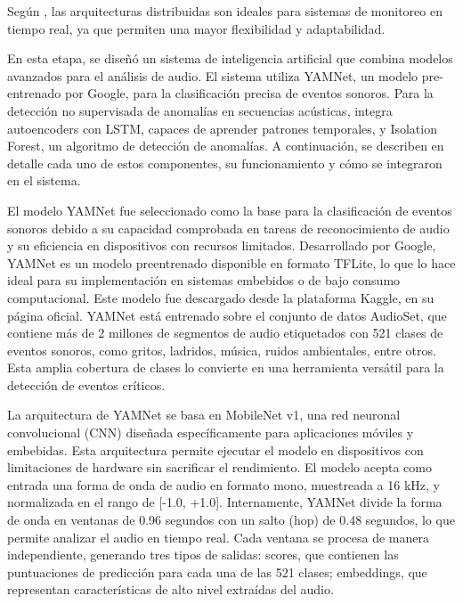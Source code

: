 
Según \citeauthor{shi_edge_2016} \citeyear{shi_edge_2016}, las arquitecturas distribuidas son ideales para sistemas de monitoreo en tiempo real, ya que permiten una mayor flexibilidad y adaptabilidad.


En esta etapa, se diseñó un sistema de inteligencia artificial que combina modelos avanzados para el análisis de audio. El sistema utiliza YAMNet, un modelo pre-entrenado por Google, para la clasificación precisa de eventos sonoros. Para la detección no supervisada de anomalías en secuencias acústicas, integra autoencoders con LSTM, capaces de aprender patrones temporales, y Isolation Forest, un algoritmo de detección de anomalías. A continuación, se describen en detalle cada uno de estos componentes, su funcionamiento y cómo se integraron en el sistema.


El modelo YAMNet fue seleccionado como la base para la clasificación de eventos sonoros debido a su capacidad comprobada en tareas de reconocimiento de audio y su eficiencia en dispositivos con recursos limitados. Desarrollado por Google, YAMNet es un modelo preentrenado disponible en formato TFLite, lo que lo hace ideal para su implementación en sistemas embebidos o de bajo consumo computacional. Este modelo fue descargado desde la plataforma Kaggle, en su página oficial. YAMNet está entrenado sobre el conjunto de datos AudioSet, que contiene más de 2 millones de segmentos de audio etiquetados con 521 clases de eventos sonoros, como gritos, ladridos, música, ruidos ambientales, entre otros. Esta amplia cobertura de clases lo convierte en una herramienta versátil para la detección de eventos críticos.

La arquitectura de YAMNet se basa en MobileNet v1, una red neuronal convolucional (CNN) diseñada específicamente para aplicaciones móviles y embebidas. Esta arquitectura permite ejecutar el modelo en dispositivos con limitaciones de hardware sin sacrificar el rendimiento. El modelo acepta como entrada una forma de onda de audio en formato mono, muestreada a 16 kHz, y normalizada en el rango de [-1.0, +1.0]. Internamente, YAMNet divide la forma de onda en ventanas de 0.96 segundos con un salto (hop) de 0.48 segundos, lo que permite analizar el audio en tiempo real. Cada ventana se procesa de manera independiente, generando tres tipos de salidas: scores, que contienen las puntuaciones de predicción para cada una de las 521 clases; embeddings, que representan características de alto nivel extraídas del audio.


